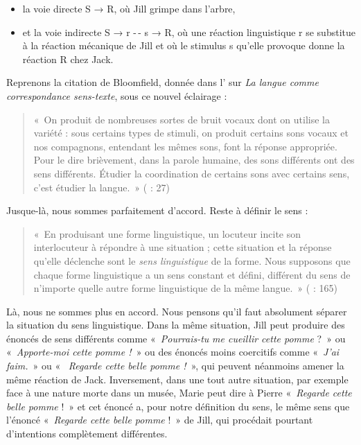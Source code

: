 \begin{itemize}
\item la voie directe S → R, où Jill grimpe dans l’arbre,
\item et la voie indirecte S → r -\,- s → R, où une réaction linguistique r se substitue à la réaction mécanique de Jill et où le stimulus s qu’elle provoque donne la réaction R chez Jack.
\end{itemize}

Reprenons la citation de Bloomfield, donnée dans l’ sur \textit{La langue comme correspondance sens-texte}, sous ce nouvel éclairage :

\begin{quote}
    «~On produit de nombreuses sortes de bruit vocaux dont on utilise la variété : sous certains types de stimuli, on produit certains sons vocaux et nos compagnons, entendant les mêmes sons, font la réponse appropriée. Pour le dire brièvement, dans la parole humaine, des sons différents ont des sens différents. Étudier la coordination de certains sons avec certains sens, c’est étudier la langue.~» (\citealt{bloomfield1933language} : 27)
\end{quote}

\noindent Jusque-là, nous sommes parfaitement d’accord. Reste à définir le sens :

\begin{quote}
    «~En produisant une forme linguistique, un locuteur incite son interlocuteur à répondre à une situation ; cette situation et la réponse qu’elle déclenche sont le \textit{sens linguistique} de la forme. Nous supposons que chaque forme linguistique a un sens constant et défini, différent du sens de n’importe quelle autre forme linguistique de la même langue.~» (\citealt{bloomfield1933language} : 165)
\end{quote}

\noindent Là, nous ne sommes plus en accord. Nous pensons qu’il faut absolument séparer la situation du sens linguistique. Dans la même situation, Jill peut produire des énoncés de sens différents comme «~\textit{Pourrais-tu} \textit{me cueillir cette pomme} ?~» ou «~\textit{Apporte-moi cette pomme !~}» ou des énoncés moins coercitifs comme «~\textit{J’ai faim.}~» ou «~ \textit{Regarde cette belle pomme !~}», qui peuvent néanmoins amener la même réaction de Jack. Inversement, dans une tout autre situation, par exemple face à une nature morte dans un musée, Marie peut dire à Pierre «~\textit{Regarde cette belle pomme} !~» et cet énoncé a, pour notre définition du sens, le même sens que l’énoncé «~\textit{Regarde cette belle pomme} !~» de Jill, qui procédait pourtant d’intentions complètement différentes.

